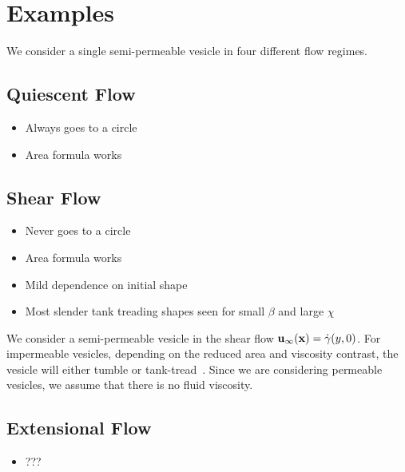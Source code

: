 \documentclass[aps,prl,showpacs]{revtex4}
\newif\ifTikz
\begin{document}


\section{Examples}
We consider a single semi-permeable vesicle in four different flow
regimes.

\subsection{Quiescent Flow}
\begin{itemize}
  \item Always goes to a circle
  \item Area formula works
\end{itemize}

\subsection{Shear Flow}
\begin{itemize}
  \item Never goes to a circle
  \item Area formula works
  \item Mild dependence on initial shape
  \item Most slender tank treading shapes seen for small $\beta$ and
    large $\chi$
\end{itemize}

We consider a semi-permeable vesicle in the shear flow
$\mathbf{u}_{\infty}(\mathbf{x}) = \dot{\gamma} (y,0)$. For impermeable vesicles,
depending on the reduced area and viscosity contrast, the vesicle will
either tumble or tank-tread~\cite{fin-lam-sei-gom2008}. Since we are
considering permeable vesicles, we assume that there is no fluid
viscosity. 


\ifTikz

\fi

\subsection{Extensional Flow}
\begin{itemize}
  \item ???
\end{itemize}
\end{document}
